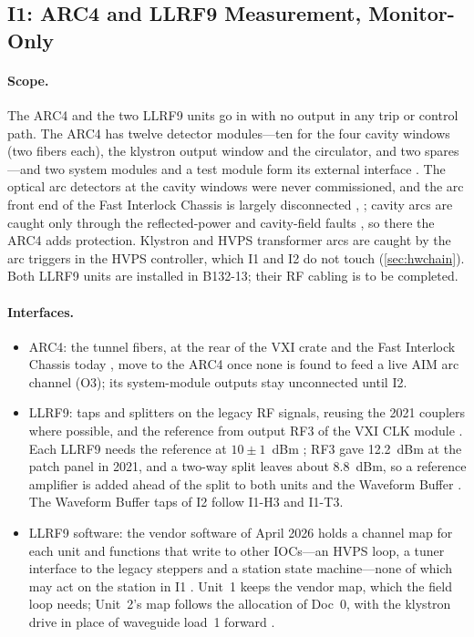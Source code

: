 \subsection{I1: ARC4 and LLRF9 Measurement, Monitor-Only}\label{sec:i-monitor}

\paragraph{Scope.} The ARC4 and the two LLRF9 units go in with no output in any trip or
control path. The ARC4 has twelve detector modules---ten for the four cavity windows
(two fibers each), the klystron output window and the circulator, and two spares---and
two system modules and a test module form its external interface . The optical
arc detectors at the cavity windows were never commissioned, and the arc front end of
the Fast Interlock Chassis is largely disconnected , ; cavity arcs are caught
only through the reflected-power and cavity-field faults , so there the ARC4 adds
protection. Klystron and HVPS transformer arcs are caught by the arc triggers in the
HVPS controller, which I1 and I2 do not touch (\cref{sec:hwchain}). Both LLRF9 units
are installed in B132-13; their RF cabling is to be completed.

\paragraph{Interfaces.}
\begin{itemize}
\item ARC4: the tunnel fibers, at the rear of the VXI crate and the Fast Interlock
Chassis today , move to the ARC4 once none is found to feed a live AIM arc channel
(O3); its system-module outputs stay unconnected until I2.
\item LLRF9: taps and splitters on the legacy RF signals, reusing the 2021 couplers
where possible, and the reference from output RF3 of the VXI CLK module . Each
LLRF9 needs the reference at $10 \pm 1$~dBm ; RF3 gave 12.2~dBm at the patch
panel in 2021, and a two-way split leaves about 8.8~dBm, so a reference amplifier is
added ahead of the split to both units and the Waveform Buffer . The Waveform
Buffer taps of I2 follow I1-H3 and I1-T3.
\item LLRF9 software: the vendor software of April 2026 holds a channel map for each
unit and functions that write to other IOCs---an HVPS loop, a tuner interface to the
legacy steppers and a station state machine---none of which may act on the station in
I1 . Unit~1 keeps the vendor map, which the field loop needs; Unit~2's map
follows the allocation of Doc~0, with the klystron drive in place of waveguide load~1
forward .
\end{itemize}

